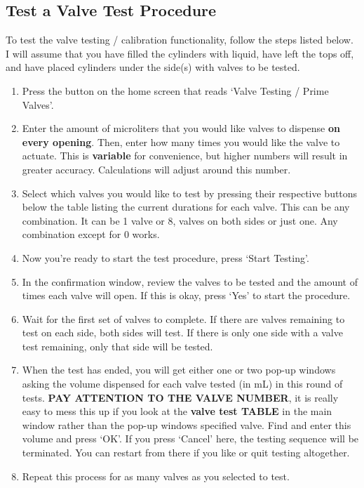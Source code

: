 \documentclass{article}
\begin{document}
\subsection{Test a Valve Test Procedure} 
To test the valve testing / calibration functionality, follow the steps listed below. I will assume that you have filled the cylinders with liquid, have left the tops off, and 
have placed cylinders under the side(s) with valves to be tested.
\begin{enumerate}
    \item Press the button on the home screen that reads `Valve Testing / Prime Valves'. 
    \item Enter the amount of microliters that you would like valves to dispense \textbf{on every opening}. Then, enter how many times you would like the valve to actuate. This is 
        \textbf{variable} for convenience, but higher numbers will result in greater accuracy. Calculations will adjust around this number.
    \item Select which valves you would like to test by pressing their respective buttons below the table listing the current durations for each valve. This can be any combination. It
        can be 1 valve or 8, valves on both sides or just one. Any combination except for 0 works.
    \item Now you're ready to start the test procedure, press `Start Testing'.
    \item In the confirmation window, review the valves to be tested and the amount of times each valve will open. If this is okay, press `Yes' to start the procedure.
    \item Wait for the first set of valves to complete. If there are valves remaining to test on each side, both sides will test. If there is only one side with a valve test remaining,
        only that side will be tested.
    \item When the test has ended, you will get either one or two pop-up windows asking the volume dispensed for each valve tested (in mL) in this round of tests. \textbf{PAY ATTENTION TO THE 
        VALVE NUMBER}, it is really easy to mess this up if you look at the \textbf{valve test TABLE} in the main window rather than the pop-up windows specified valve. Find and enter this
        volume and press `OK'. If you press `Cancel' here, the testing sequence will be terminated. You can restart from there if you like or quit testing altogether.
    \item Repeat this process for as many valves as you selected to test.

\end{enumerate}
\end{document}
